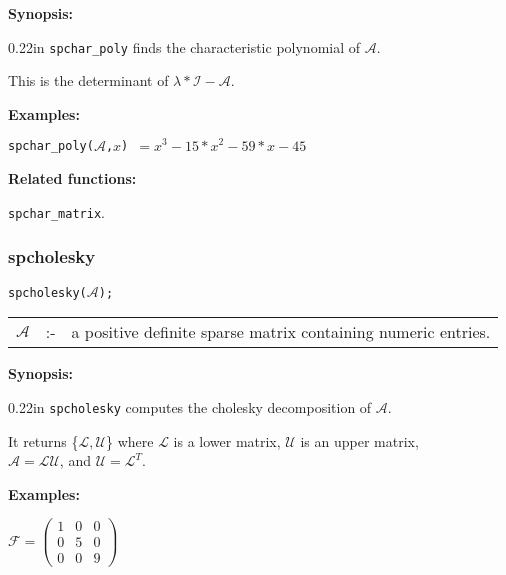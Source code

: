 \textbf{Synopsis:}

\begin{addtolength}{\leftskip}{0.22in}
\texttt{spchar\_poly} finds the characteristic polynomial of
                $\mathcal{A}$.  

This is the determinant of $\lambda * \mathcal{I} - \mathcal{A}$.

\end{addtolength}

\textbf{Examples:}

\hspace*{0.175in}
\texttt{spchar\_poly($\mathcal{A}$,$x$) $= x^3-15*x^2-59*x-45$} 

\textbf{Related functions:}

\hspace*{0.175in} \texttt{spchar\_matrix}. 


\subsubsection{spcholesky}

\hspace*{0.175in} \texttt{spcholesky($\mathcal{A}$);}

\hspace*{0.1in} 
\begin{tabular}{l l l}
$\mathcal{A}$ &:-& a positive definite sparse matrix containing numeric entries.
\end{tabular}

\textbf{Synopsis:} 

\begin{addtolength}{\leftskip}{0.22in}
\texttt{spcholesky} computes the cholesky decomposition of $\mathcal{A}$.

It returns \{$\mathcal{L,U}$\} where $\mathcal{L}$
is a lower matrix, $\mathcal{U}$ is an upper matrix, \\ $\mathcal{A} = 
\mathcal{LU}$, and $\mathcal{U} = \mathcal{L}^T$.

\end{addtolength}

\textbf{Examples:}

\begin{flushleft}  
\hspace*{0.175in}
\begin{math}  
\mathcal{F} = \left( \begin{array}{ccc} 1 & 0 & 0 \\ 0 & 5 & 0 \\ 0 & 0 & 
9
\end{array} \right)
\end{math}  
\end{flushleft}

